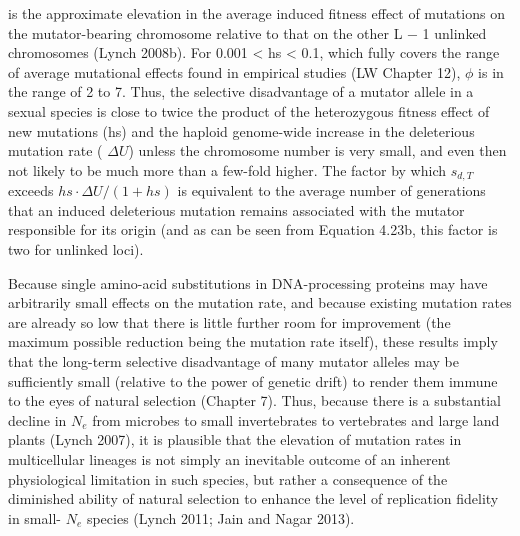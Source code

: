 \documentclass{article}
\begin{document}
is the approximate elevation in the average induced fitness effect of mutations on the mutator-bearing chromosome relative to that on the other L − 1 unlinked chromosomes (Lynch 2008b). For 0.001 < hs < 0.1, which fully covers the range of average mutational effects found in empirical studies (LW Chapter 12),  $ \phi $ is in the range of 2 to 7. Thus, the selective disadvantage of a mutator allele in a sexual species is close to twice the product of the heterozygous fitness effect of new mutations (hs) and the haploid genome-wide increase in the deleterious mutation rate ( $ \Delta U $) unless the chromosome number is very small, and even then not likely to be much more than a few-fold higher. The factor by which  $ s_{d,T} $ exceeds  $ hs \cdot \Delta U / (1 + hs) $ is equivalent to the average number of generations that an induced deleterious mutation remains associated with the mutator responsible for its origin (and as can be seen from Equation 4.23b, this factor is two for unlinked loci).

Because single amino-acid substitutions in DNA-processing proteins may have arbitrarily small effects on the mutation rate, and because existing mutation rates are already so low that there is little further room for improvement (the maximum possible reduction being the mutation rate itself), these results imply that the long-term selective disadvantage of many mutator alleles may be sufficiently small (relative to the power of genetic drift) to render them immune to the eyes of natural selection (Chapter 7). Thus, because there is a substantial decline in  $ N_{e} $ from microbes to small invertebrates to vertebrates and large land plants (Lynch 2007), it is plausible that the elevation of mutation rates in multicellular lineages is not simply an inevitable outcome of an inherent physiological limitation in such species, but rather a consequence of the diminished ability of natural selection to enhance the level of replication fidelity in small- $ N_{e} $ species (Lynch 2011; Jain and Nagar 2013).
\end{document}
